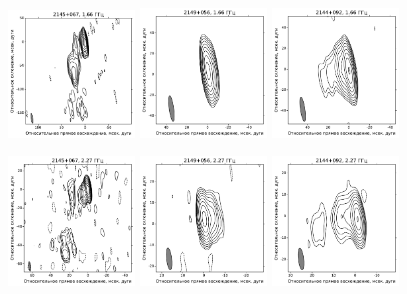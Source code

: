 \addtocounter{figure}{-1}
\begin{figure}
  \centering

  \includegraphics[width=0.3\textwidth]{2145+067_L.pdf}
  \includegraphics[width=0.3\textwidth]{2149+056_L.pdf}
  \includegraphics[width=0.3\textwidth]{2144+092_L.pdf}


  \includegraphics[width=0.3\textwidth]{2145+067_S.pdf}
  \includegraphics[width=0.3\textwidth]{2149+056_S.pdf}
  \includegraphics[width=0.3\textwidth]{2144+092_S.pdf}



\end{figure}

